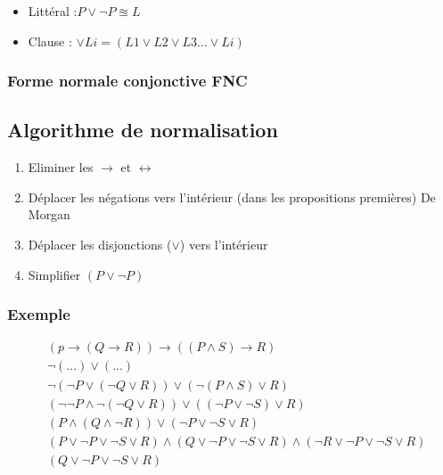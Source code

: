 \begin{itemize}
	\item Littéral :$ P \lor \lnot P \approxeq L$
	\item Clause : $\lor L{i} = ( L{1} \lor L{2} \lor L{3} ... \lor L{i} )$
\end{itemize}

\subsubsection{Forme normale conjonctive FNC}

\subsection{Algorithme de normalisation}

\begin{enumerate}
\item Eliminer les $\rightarrow$ et $\leftrightarrow$
\item Déplacer les négations vers l'intérieur (dans les propositions premières) De Morgan
\item Déplacer les disjonctions ($\lor$) vers l'intérieur
\item Simplifier $(P \lor \lnot P)$
\end{enumerate}

\subsubsection{Exemple}

\begin{align*}
& (p \rightarrow (Q \rightarrow R)) \rightarrow ((P \land S) \rightarrow R) \\
& \lnot ( ... ) \lor ( ... ) \\
& \lnot (\lnot P \lor (\lnot Q \lor R)) \lor (\lnot (P \land S) \lor R) \\
& ( \lnot \lnot P \land \lnot (\lnot Q \lor R)) \lor ((\lnot P \lor \lnot S) \lor R) \\
& (P \land (Q \land \lnot R)) \lor ( \lnot P \lor \lnot S \lor R) \\
& (P \lor \lnot P \lor \lnot S \lor R) \land ( Q \lor \lnot P \lor \lnot S \lor R) \land (\lnot R \lor \lnot P \lor \lnot S \lor R) \\
& (Q \lor \lnot P \lor \lnot S \lor R) 
\end{align*}

